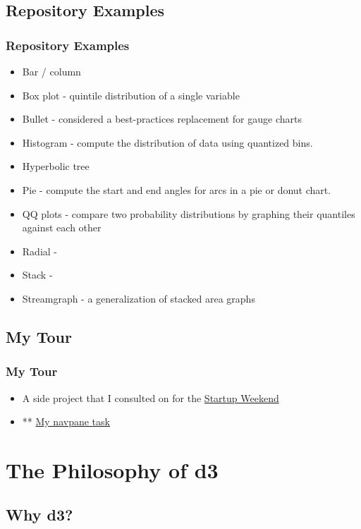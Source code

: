 \documentclass{beamer}
\begin{document}
\subsection{Repository Examples}

\begin{frame}
\frametitle{Repository Examples}
\begin{itemize}
\item Bar / column 
\item Box plot - quintile distribution of a single variable
\item Bullet - considered a best-practices replacement for gauge charts
\item Histogram - compute the distribution of data using quantized bins.
\item Hyperbolic tree
\item Pie - compute the start and end angles for arcs in a pie or donut chart.
\item QQ plots - compare two probability distributions by graphing their quantiles against each other
\item Radial - 
\item Stack - 
\item Streamgraph - a generalization of stacked area graphs
\end{itemize}
\end{frame}



\subsection{My Tour}

\begin{frame}
\frametitle{My Tour}
\begin{itemize}
\item A side project that I consulted on for the \href{http://www.startupweekendviz.johnmorefield.com/d3/examples/SW/map.html}{Startup Weekend}
\item ** \href{http://localhost:9000/examples/my_cisnet_demo/navpane.html}{My navpane task}
\end{itemize}
\end{frame}



\section{The Philosophy of d3}

\subsection{Why d3?}
\end{document}
